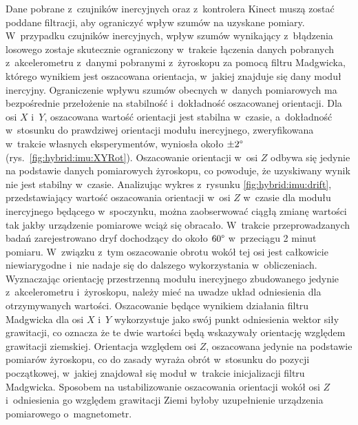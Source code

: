 Dane pobrane z~czujników inercyjnych oraz z~kontrolera Kinect muszą zostać poddane filtracji, aby ograniczyć wpływ szumów na uzyskane pomiary. W~przypadku czujników inercyjnych, wpływ szumów wynikający z~błądzenia losowego zostaje skutecznie ograniczony w~trakcie łączenia danych pobranych z~akcelerometru z~danymi pobranymi z~żyroskopu za pomocą filtru Madgwicka, którego wynikiem jest oszacowana orientacja, w~jakiej znajduje się dany moduł inercyjny. Ograniczenie wpływu szumów obecnych w~danych pomiarowych ma bezpośrednie przełożenie na stabilność i~dokładność oszacowanej orientacji. Dla osi $X$ i~$Y$, oszacowana wartość orientacji jest stabilna w~czasie, a~dokładność w~stosunku do prawdziwej orientacji modułu inercyjnego, zweryfikowana w~trakcie własnych eksperymentów, wyniosła około $\pm 2\degree$ (rys.~\ref{fig:hybrid:imu:XYRot}).
Oszacowanie orientacji w~osi $Z$ odbywa się jedynie na podstawie danych pomiarowych żyroskopu, co powoduje, że uzyskiwany wynik nie jest stabilny w~czasie. Analizując wykres z~rysunku \ref{fig:hybrid:imu:drift}, przedstawiający wartość oszacowania orientacji w~osi $Z$ w~czasie dla modułu inercyjnego będącego w~spoczynku, można zaobserwować ciągłą zmianę wartości tak jakby urządzenie pomiarowe wciąż się obracało. W~trakcie przeprowadzanych badań zarejestrowano dryf dochodzący do około $60\degree$ w~przeciągu 2 minut pomiaru. W~związku z~tym oszacowanie obrotu wokół tej osi jest całkowicie niewiarygodne i~nie nadaje się do dalszego wykorzystania w~obliczeniach. \\
Wyznaczając orientację przestrzenną modułu inercyjnego zbudowanego jedynie z~akcelerometru i~żyroskopu, należy mieć na uwadze układ odniesienia dla otrzymywanych wartości. Oszacowanie będące wynikiem działania filtru Madgwicka dla osi $X$ i~$Y$ wykorzystuje jako swój punkt odniesienia wektor siły grawitacji, co oznacza że te dwie wartości będą wskazywały orientację względem grawitacji ziemskiej. Orientacja względem osi $Z$, oszacowana jedynie na podstawie pomiarów żyroskopu, co do zasady wyraża obrót w~stosunku do pozycji początkowej, w~jakiej znajdował się moduł w~trakcie inicjalizacji filtru Madgwicka. Sposobem na ustabilizowanie oszacowania orientacji wokół osi $Z$ i~odniesienia go względem grawitacji Ziemi byłoby uzupełnienie urządzenia pomiarowego o~magnetometr. \\
		
